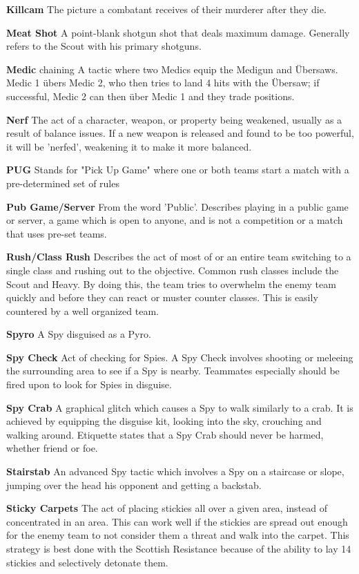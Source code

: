 {\bf Killcam} The picture a combatant receives of their murderer after they die.
 
{\bf Meat Shot} A point-blank shotgun shot that deals maximum damage. Generally refers to the Scout with his primary shotguns.

{\bf Medic} chaining A tactic where two Medics equip the Medigun and Übersaws. Medic 1 übers Medic 2, who then tries to land 4 hits with the Übersaw; if successful, Medic 2 can then über Medic 1 and they trade positions.

{\bf Nerf} The act of a character, weapon, or property being weakened, usually as a result of balance issues. If a new weapon is released and found to be too powerful, it will be 'nerfed', weakening it to make it more balanced.

{\bf PUG} Stands for "Pick Up Game" where one or both teams start a match with a pre-determined set of rules

{\bf Pub Game/Server} From the word 'Public'. Describes playing in a public game or server, a game which is open to anyone, and is not a competition or a match that uses pre-set teams.

{\bf Rush/Class Rush} Describes the act of most of or an entire team switching to a single class and rushing out to the objective. Common rush classes include the Scout and Heavy. By doing this, the team tries to overwhelm the enemy team quickly and before they can react or muster counter classes. This is easily countered by a well organized team.

{\bf Spyro} A Spy disguised as a Pyro.

{\bf Spy Check} Act of checking for Spies. A Spy Check involves shooting or meleeing the surrounding area to see if a Spy is nearby.  Teammates especially should be fired upon to look for Spies in disguise.

{\bf Spy Crab} A graphical glitch which causes a Spy to walk similarly to a crab. It is achieved by equipping the disguise kit, looking into the sky, crouching and walking around. Etiquette states that a Spy Crab should never be harmed, whether friend or foe.

{\bf Stairstab} An advanced Spy tactic which involves a Spy on a staircase or slope, jumping over the head his opponent and getting a backstab.

{\bf Sticky Carpets} The act of placing stickies all over a given area, instead of concentrated in an area. This can work well if the stickies are spread out enough for the enemy team to not consider them a threat and walk into the carpet. This strategy is best done with the Scottish Resistance because of the ability to lay 14 stickies and selectively detonate them.

